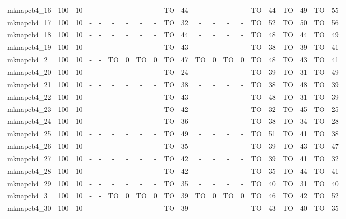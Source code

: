 \begin{sidewaystable}[!ht]
{\begin{tabular}{lcccccccccccccccccccc}
mknapcb4\_16 & 100 & 10 &  - &  - &  - &  - &  - &  - & TO & 44 &  - &  - &  - &  - & TO & 44 & TO & 49 & TO & 55 \\
mknapcb4\_17 & 100 & 10 &  - &  - &  - &  - &  - &  - & TO & 32 &  - &  - &  - &  - & TO & 52 & TO & 50 & TO & 56 \\
mknapcb4\_18 & 100 & 10 &  - &  - &  - &  - &  - &  - & TO & 44 &  - &  - &  - &  - & TO & 48 & TO & 44 & TO & 49 \\
mknapcb4\_19 & 100 & 10 &  - &  - &  - &  - &  - &  - & TO & 43 &  - &  - &  - &  - & TO & 38 & TO & 39 & TO & 41 \\
mknapcb4\_2 & 100 & 10 &  - &  - & TO & 0 & TO & 0 & TO & 47 & TO & 0 & TO & 0 & TO & 48 & TO & 43 & TO & 41 \\
mknapcb4\_20 & 100 & 10 &  - &  - &  - &  - &  - &  - & TO & 24 &  - &  - &  - &  - & TO & 39 & TO & 31 & TO & 49 \\
mknapcb4\_21 & 100 & 10 &  - &  - &  - &  - &  - &  - & TO & 38 &  - &  - &  - &  - & TO & 38 & TO & 48 & TO & 39 \\
mknapcb4\_22 & 100 & 10 &  - &  - &  - &  - &  - &  - & TO & 43 &  - &  - &  - &  - & TO & 48 & TO & 31 & TO & 39 \\
mknapcb4\_23 & 100 & 10 &  - &  - &  - &  - &  - &  - & TO & 42 &  - &  - &  - &  - & TO & 32 & TO & 45 & TO & 25 \\
mknapcb4\_24 & 100 & 10 &  - &  - &  - &  - &  - &  - & TO & 36 &  - &  - &  - &  - & TO & 38 & TO & 34 & TO & 28 \\
mknapcb4\_25 & 100 & 10 &  - &  - &  - &  - &  - &  - & TO & 49 &  - &  - &  - &  - & TO & 51 & TO & 41 & TO & 38 \\
mknapcb4\_26 & 100 & 10 &  - &  - &  - &  - &  - &  - & TO & 35 &  - &  - &  - &  - & TO & 39 & TO & 43 & TO & 47 \\
mknapcb4\_27 & 100 & 10 &  - &  - &  - &  - &  - &  - & TO & 42 &  - &  - &  - &  - & TO & 39 & TO & 41 & TO & 32 \\
mknapcb4\_28 & 100 & 10 &  - &  - &  - &  - &  - &  - & TO & 42 &  - &  - &  - &  - & TO & 35 & TO & 44 & TO & 41 \\
mknapcb4\_29 & 100 & 10 &  - &  - &  - &  - &  - &  - & TO & 35 &  - &  - &  - &  - & TO & 40 & TO & 31 & TO & 40 \\
mknapcb4\_3 & 100 & 10 &  - &  - & TO & 0 & TO & 0 & TO & 39 & TO & 0 & TO & 0 & TO & 46 & TO & 42 & TO & 52 \\
mknapcb4\_30 & 100 & 10 &  - &  - &  - &  - &  - &  - & TO & 39 &  - &  - &  - &  - & TO & 43 & TO & 40 & TO & 35 \\

\end{tabular}}
\end{sidewaystable}
